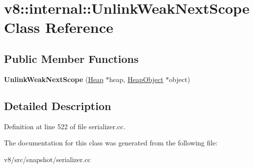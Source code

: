 \hypertarget{classv8_1_1internal_1_1UnlinkWeakNextScope}{}\section{v8\+:\+:internal\+:\+:Unlink\+Weak\+Next\+Scope Class Reference}
\label{classv8_1_1internal_1_1UnlinkWeakNextScope}
\subsection*{Public Member Functions}
\begin{DoxyCompactItemize}
\item 
\mbox{\label{classv8_1_1internal_1_1UnlinkWeakNextScope_a2f4825e572be8839946d6e74d4ba1f38}} 
{\bfseries Unlink\+Weak\+Next\+Scope} (\mbox{\hyperlink{classv8_1_1internal_1_1Heap}{Heap}} $\ast$heap, \mbox{\hyperlink{classv8_1_1internal_1_1HeapObject}{Heap\+Object}} $\ast$object)
\end{DoxyCompactItemize}


\subsection{Detailed Description}


Definition at line 522 of file serializer.\+cc.



The documentation for this class was generated from the following file\+:\begin{DoxyCompactItemize}
\item 
v8/src/snapshot/serializer.\+cc\end{DoxyCompactItemize}

